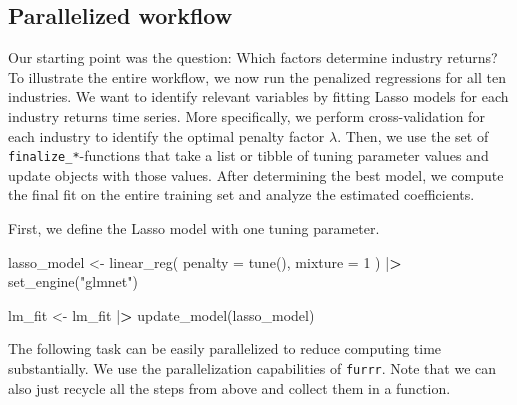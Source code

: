 \documentclass[
]{krantz}
\newenvironment{Shaded}{\begin{snugshade}}{\end{snugshade}}
\newcommand{\AttributeTok}[1]{\textcolor[rgb]{0.61,0.61,0.61}{#1}}
\newcommand{\DecValTok}[1]{\textcolor[rgb]{0.06,0.06,0.06}{#1}}
\newcommand{\ErrorTok}[1]{\textcolor[rgb]{0.14,0.14,0.14}{\textbf{#1}}}
\newcommand{\FunctionTok}[1]{\textcolor[rgb]{0,0,0}{#1}}
\newcommand{\NormalTok}[1]{#1}
\newcommand{\OtherTok}[1]{\textcolor[rgb]{0.37,0.37,0.37}{#1}}
\newcommand{\SpecialCharTok}[1]{\textcolor[rgb]{0,0,0}{#1}}
\newcommand{\StringTok}[1]{\textcolor[rgb]{0.5,0.5,0.5}{#1}}
\begin{document}
\hypertarget{parallelized-workflow}{%
\subsection{Parallelized workflow}\label{parallelized-workflow}}

Our starting point was the question: Which factors determine industry returns? To illustrate the entire workflow, we now run the penalized regressions for all ten industries. We want to identify relevant variables by fitting Lasso models for each industry returns time series. More specifically, we perform cross-validation for each industry to identify the optimal penalty factor \(\lambda\). Then, we use the set of \texttt{finalize\_*}-functions that take a list or tibble of tuning parameter values and update objects with those values. After determining the best model, we compute the final fit on the entire training set and analyze the estimated coefficients.

First, we define the Lasso model with one tuning parameter.

\begin{Shaded}
\begin{Highlighting}[]
\NormalTok{lasso\_model }\OtherTok{\textless{}{-}} \FunctionTok{linear\_reg}\NormalTok{(}
  \AttributeTok{penalty =} \FunctionTok{tune}\NormalTok{(),}
  \AttributeTok{mixture =} \DecValTok{1}
\NormalTok{) }\SpecialCharTok{|}\ErrorTok{\textgreater{}}
  \FunctionTok{set\_engine}\NormalTok{(}\StringTok{"glmnet"}\NormalTok{)}

\NormalTok{lm\_fit }\OtherTok{\textless{}{-}}\NormalTok{ lm\_fit }\SpecialCharTok{|}\ErrorTok{\textgreater{}}
  \FunctionTok{update\_model}\NormalTok{(lasso\_model)}
\end{Highlighting}
\end{Shaded}

The following task can be easily parallelized to reduce computing time substantially. We use the parallelization capabilities of \texttt{furrr}. Note that we can also just recycle all the steps from above and collect them in a function.
\end{document}
